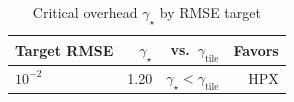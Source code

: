 \begin{table}[t]
\centering
\caption{Critical overhead $\gamma_\star$ by RMSE target}
\label{tab:gamma_star}
\footnotesize
\setlength{\tabcolsep}{3pt}
\begin{tabular}{lrrr}
\toprule
Target RMSE & $\gamma_\star$ & vs.\ $\gamma_{\mathrm{tile}}$ & Favors \\
\midrule
$10^{-2}$ & 1.20 & $\gamma_\star < \gamma_{\mathrm{tile}}$ & HPX \\
\bottomrule
\end{tabular}
\end{table}
